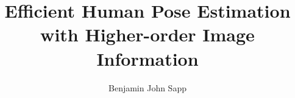\documentclass[12pt]{report}%
\begin{document}

\newcommand{\mytitle}{Efficient Human Pose Estimation with Higher-order Image Information}
\newcommand{\MYTITLE}{EFFICIENT HUMAN POSE ESTIMATION WITH HIGHER-ORDER IMAGE INFORMATION}

\title{\mytitle}
\author{Benjamin John Sapp}


  
 \beforepreface
\newpage
\copyrightpage
{}

\newpage
\abstractp

\afterpreface
{}


\newpage
{}
\pagestyle{plain}


\clearpage

\clearpage



\end{document}

